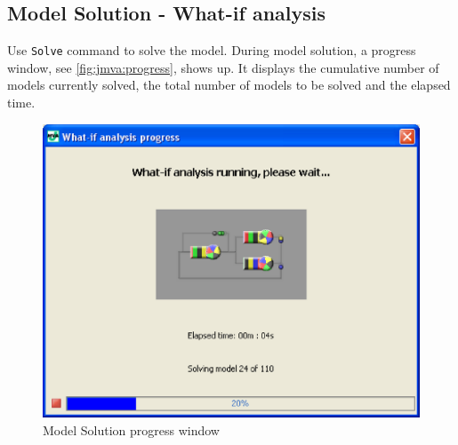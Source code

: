 \subsection{Model Solution - What-if analysis}
\label{sec:jmva:solutionWhatif}Use \texttt{Solve} command to solve
the model. During model solution, a progress window, see
\autoref{fig:jmva:progress}, shows up. It displays the cumulative
number of models currently solved, the total number of models to be
solved and the elapsed time.

\begin{figure}[htbp]
    \begin{center}
        \includegraphics[scale=.5]{img/jmva/progress}
    \end{center}
    \caption{Model Solution progress window}
    \label{fig:jmva:progress}
\end{figure}

